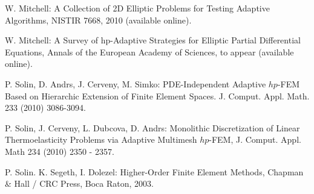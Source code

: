\documentclass[12pt]{elsarticle}
\begin{document}


\begin{thebibliography}{[KLR73]}

W. Mitchell: A Collection of 2D Elliptic Problems for
Testing Adaptive Algorithms, NISTIR 7668, 2010 (available online).

\vspace{-2mm}

W. Mitchell: A Survey of hp-Adaptive Strategies for Elliptic Partial Differential Equations,
Annals of the European Academy of Sciences, to appear (available online).

\vspace{-2mm}



P. Solin, D. Andrs, J. Cerveny, M. Simko:
PDE-Independent Adaptive $hp$-FEM Based on Hierarchic Extension of Finite Element Spaces.
J. Comput. Appl. Math. 233 (2010) 3086-3094.

\vspace{-2mm}

P. Solin, J. Cerveny, L. Dubcova, D. Andrs:
Monolithic Discretization of Linear Thermoelasticity Problems
via Adaptive Multimesh $hp$-FEM, J. Comput. Appl. Math 234 (2010) 2350 - 2357.

\vspace{-2mm}

P. Solin. K. Segeth, I. Dolezel: Higher-Order Finite Element Methods, Chapman \& Hall
/ CRC Press, Boca Raton, 2003.
\end{thebibliography}

\end{document}
